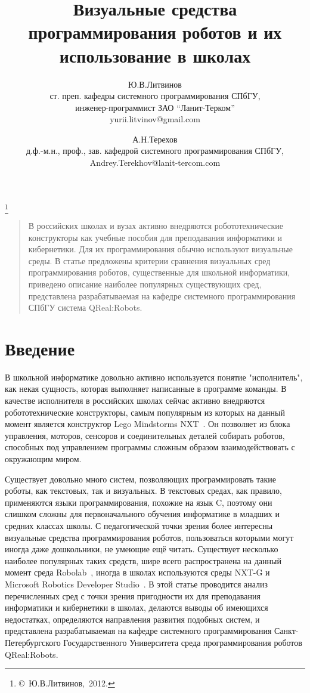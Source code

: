 \documentclass[a4paper]{article}
\title{Визуальные средства программирования роботов и их использование в школах}
\author{Ю.В.Литвинов \\ ст. преп. кафедры системного программирования СПбГУ, \\ инженер-программист ЗАО ``Ланит-Терком'' \\ yurii.litvinov@gmail.com \and А.Н.Терехов \\ д.ф.-м.н., проф., зав. кафедрой системного программирования СПбГУ, \\ Andrey.Terekhov@lanit-tercom.com}
\date{}
\begin{document}
\maketitle
\thispagestyle{empty}

\renewcommand{\thefootnote}{}
\footnote{\small{\copyright~Ю.В.Литвинов,~2012.}}
\renewcommand{\thefootnote}{\arabic{footnote}}
\setcounter{footnote}{0}

\begin{quote}
\small\noindent
В российских школах и вузах активно внедряются робототехнические конструкторы как учебные пособия для преподавания информатики и кибернетики. Для их программирования обычно используют визуальные среды. В статье предложены критерии сравнения визуальных сред программирования роботов, существенные для школьной информатики, приведено описание наиболее популярных существующих сред, представлена разрабатываемая на кафедре системного программирования СПбГУ система QReal:Robots.
\end{quote}

\section*{Введение}
В школьной информатике довольно активно используется понятие "исполнитель", как некая сущность, которая выполняет написанные в программе команды. В качестве исполнителя в российских школах сейчас активно внедряются робототехнические конструкторы, самым популярным из которых на данный момент является конструктор Lego Mindstorms NXT~\cite{legoNxt}. Он позволяет из блока управления, моторов, сенсоров и соединительных деталей собирать роботов, способных под управлением программы сложным образом взаимодействовать с окружающим миром.

Существует довольно много систем, позволяющих программировать такие роботы, как текстовых, так и визуальных. В текстовых средах, как правило, применяются языки программирования, похожие на язык C, поэтому они слишком сложны для первоначального обучения информатике в младших и средних классах школы. С педагогической точки зрения более интересны визуальные средства программирования роботов, пользоваться которыми могут иногда даже дошкольники, не умеющие ещё читать. Существует несколько наиболее популярных таких средств, шире всего распространена на данный момент среда Robolab~\cite{robolab}, иногда в школах используются среды NXT-G и Microsoft Robotics Developer Studio~\cite{mrds}. В этой статье проводится анализ перечисленных сред с точки зрения пригодности их для преподавания информатики и кибернетики в школах, делаются выводы об имеющихся недостатках, определяются направления развития подобных систем, и представлена разрабатываемая на кафедре системного программирования Санкт-Петербургского Государственного Университета среда программирования роботов QReal:Robots.
\end{document}
